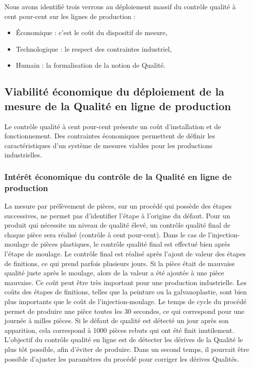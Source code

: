 Nous avons identifié trois verrous au déploiement massif du contrôle qualité à cent pour-cent sur les lignes de production :
\begin{itemize}
\item Économique : c’est le coût du dispositif de mesure,
\item Technologique : le respect des contraintes industriel,
\item Humain : la formalisation de la notion de Qualité.
\end{itemize}

\subsection{Viabilité économique du déploiement de la mesure de la Qualité en ligne de production}
Le contrôle qualité à cent pour-cent présente un coût d'installation et de fonctionnement.
Des contraintes économiques permettent de définir les caractéristiques d'un système de mesures viables pour les productions industrielles.

\subsubsection{Intérêt économique du contrôle de la Qualité en ligne de production}
La mesure par prélèvement de pièces, sur un procédé qui possède des étapes successives, ne permet pas d’identifier l’étape à l’origine du défaut.
Pour un produit qui nécessite un niveau de qualité élevé, un contrôle qualité final de chaque pièce sera réalisé (contrôle à cent pour-cent).
Dans le cas de l'injection-moulage de pièces plastiques, le contrôle qualité final est effectué bien après l’étape de moulage.
Le contrôle final est réalisé après l’ajout de valeur des étapes de finitions, ce qui prend parfois plusieurs jours.
Si la pièce était de mauvaise qualité juste après le moulage, alors de la valeur a été ajoutée à une pièce mauvaise.
Ce coût peut être très important pour une production industrielle.
Les coûts des étapes de finitions, telles que la peinture ou la galvanoplastie, sont bien plus importants que le coût de l'injection-moulage.
Le temps de cycle du procédé permet de produire une pièce toutes les 30 secondes, ce qui correspond pour une journée à milles pièces.
Si le défaut de qualité est détecté un jour après son apparition, cela correspond à 1000 pièces rebuts qui ont été finit inutilement.
L’objectif du contrôle qualité en ligne est de détecter les dérives de la Qualité le plus tôt possible, afin d'éviter de produire.
Dans un second temps, il pourrait être possible d'ajuster les paramètres du procédé pour corriger les dérives Qualités.


